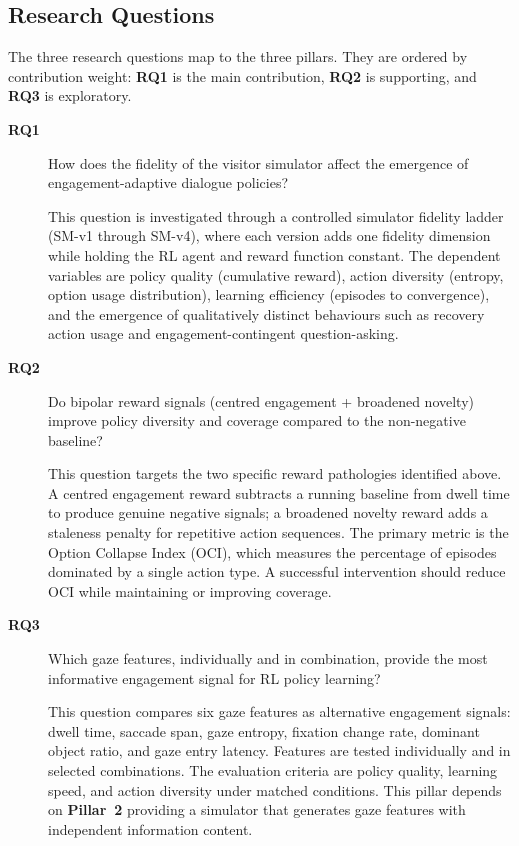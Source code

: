 \documentclass[a4paper, 11pt]{article}
\newcommand{\pillar}[1]{\textbf{Pillar~#1}}
\newcommand{\researchq}[1]{\textbf{RQ#1}}
\begin{document}
\subsection{Research Questions}
\label{sec:research_questions}

The three research questions map to the three pillars. They are ordered by contribution weight: \researchq{1} is the main contribution, \researchq{2} is supporting, and \researchq{3} is exploratory.

\begin{description}
  \item[\researchq{1}] How does the fidelity of the visitor simulator affect the emergence of engagement-adaptive dialogue policies?

  This question is investigated through a controlled simulator fidelity ladder (SM-v1 through SM-v4), where each version adds one fidelity dimension while holding the RL agent and reward function constant. The dependent variables are policy quality (cumulative reward), action diversity (entropy, option usage distribution), learning efficiency (episodes to convergence), and the emergence of qualitatively distinct behaviours such as recovery action usage and engagement-contingent question-asking.

  \item[\researchq{2}] Do bipolar reward signals (centred engagement + broadened novelty) improve policy diversity and coverage compared to the non-negative baseline?

  This question targets the two specific reward pathologies identified above. A centred engagement reward subtracts a running baseline from dwell time to produce genuine negative signals; a broadened novelty reward adds a staleness penalty for repetitive action sequences. The primary metric is the Option Collapse Index (OCI), which measures the percentage of episodes dominated by a single action type. A successful intervention should reduce OCI while maintaining or improving coverage.

  \item[\researchq{3}] Which gaze features, individually and in combination, provide the most informative engagement signal for RL policy learning?

  This question compares six gaze features as alternative engagement signals: dwell time, saccade span, gaze entropy, fixation change rate, dominant object ratio, and gaze entry latency. Features are tested individually and in selected combinations. The evaluation criteria are policy quality, learning speed, and action diversity under matched conditions. This pillar depends on \pillar{2} providing a simulator that generates gaze features with independent information content.
\end{description}
\end{document}
